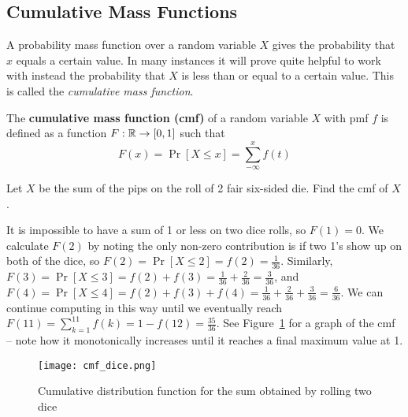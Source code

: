 \documentclass[../main.tex]{subfiles}
\begin{document}
\subsection{Cumulative Mass Functions}
A probability mass function over a random variable $X$ gives the probability 
that $x$ equals a certain value. In many instances it will prove quite helpful 
to work with instead the probability that $X$ is less than or equal to a 
certain value. This is called the \textit{cumulative mass function}.
\begin{definition}
The \textbf{cumulative mass function (cmf)} of a random variable $X$ with 
pmf $f$ is defined as a function $F: \mathbb{R}\rightarrow[0,1]$ such that
$$F(x) = \Pr[X \leq x] = \sum_{-\infty}^x f(t)$$
\end{definition}
\begin{example}Let $X$ be the sum of the pips on the roll of 2 fair six-sided
die. Find the cmf of $X$.
\end{example}
\begin{solution}
It is impossible to have a sum of 1 or less on two dice rolls, so $F(1) = 0$. We calculate $F(2)$ by noting the only non-zero contribution is if two 1's show up on both of the dice, so $F(2) = \Pr[X \leq 2] = f(2) = \frac{1}{36}$. Similarly, $F(3) = \Pr[X \leq 3] = f(2) + f(3) = \frac{1}{36} + \frac{2}{36} = \frac{3}{36}$, and $F(4) = \Pr[X \leq 4] =  f(2) + f(3) + f(4)= \frac{1}{36} + \frac{2}{36} + \frac{3}{36} = \frac{6}{36}$. We can continue computing in this way until we eventually reach $F(11) = \displaystyle\sum_{k=1}^{11} f(k) = 1-f(12) = \frac{35}{36}$. See Figure~\ref{fig:cmf_dice} for a graph of the cmf -- note how it monotonically increases until it reaches a final maximum value at 1. 
\begin{figure}
	\centering
	\texttt{[image: cmf\_dice.png]}
	\caption{Cumulative distribution function for the sum obtained by rolling two dice}
	\label{fig:cmf_dice}
\end{figure}

\end{solution}
\end{document}
